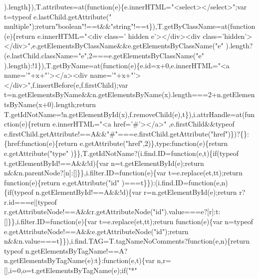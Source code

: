 \begin{DoxyCode}
{{{      ).length\}),T.attributes=at(function(e)\{e.innerHTML="}<select></select>\textcolor{stringliteral}{";var t=typeof e.lastChild.getAttribute("}
      multiple\textcolor{stringliteral}{");return"}\textcolor{keywordtype}{boolean}\textcolor{stringliteral}{"!==t&&"}\textcolor{keywordtype}{string}\textcolor{stringliteral}{"!==t\}),T.getByClassName=at(function(e)\{return e.innerHTML="}<div \textcolor{keyword}{class}=\textcolor{stringliteral}{'
      hidden e'}></div><div \textcolor{keyword}{class}=\textcolor{stringliteral}{'hidden'}></div>\textcolor{stringliteral}{",e.getElementsByClassName&&e.getElementsByClassName("}e\textcolor{stringliteral}{"
      ).length?(e.lastChild.className="}e\textcolor{stringliteral}{",2===e.getElementsByClassName("}e\textcolor{stringliteral}{"
      ).length):!1\}),T.getByName=at(function(e)\{e.id=x+0,e.innerHTML="}<a name=\textcolor{stringliteral}{'"+x+"'}></a><div name=\textcolor{stringliteral}{'"+x+"'}></div>\textcolor{stringliteral}{",f.insertBefore(e,f.firstChild);var
       t=n.getElementsByName&&n.getElementsByName(x).length===2+n.getElementsByName(x+0).length;return
       T.getIdNotName=!n.getElementById(x),f.removeChild(e),t\}),i.attrHandle=at(function(e)\{return e.innerHTML="}<a href=\textcolor{charliteral}{'#'}></a>\textcolor{stringliteral}{"
      ,e.firstChild&&typeof e.firstChild.getAttribute!==A&&"}#\textcolor{stringliteral}{"===e.firstChild.getAttribute("}href\textcolor{stringliteral}{")\})?\{\}:\{href:function(e)\{return
       e.getAttribute("}href\textcolor{stringliteral}{",2)\},type:function(e)\{return e.getAttribute("}type\textcolor{stringliteral}{"
      )\}\},T.getIdNotName?(i.find.ID=function(e,t)\{if(typeof t.getElementById!==A&&!d)\{var n=t.getElementById(e);return
       n&&n.parentNode?[n]:[]\}\},i.filter.ID=function(e)\{var t=e.replace(et,tt);return function(e)\{return e.getAttribute("}\textcolor{keywordtype}{id}\textcolor{stringliteral}{"
      )===t\}\}):(i.find.ID=function(e,n)\{if(typeof n.getElementById!==A&&!d)\{var r=n.getElementById(e);return r?r.id===e||typeof
       r.getAttributeNode!==A&&r.getAttributeNode("}\textcolor{keywordtype}{id}\textcolor{stringliteral}{").value===e?[r]:t:[]\}\},i.filter.ID=function(e)\{var
       t=e.replace(et,tt);return function(e)\{var n=typeof e.getAttributeNode!==A&&e.getAttributeNode("}\textcolor{keywordtype}{id}\textcolor{stringliteral}{");return
       n&&n.value===t\}\}),i.find.TAG=T.tagNameNoComments?function(e,n)\{return typeof
       n.getElementsByTagName!==A?n.getElementsByTagName(e):t\}:function(e,t)\{var n,r=[],i=0,o=t.getElementsByTagName(e);if("}*\textcolor{stringliteral}{"
}}}
\end{DoxyCode}
